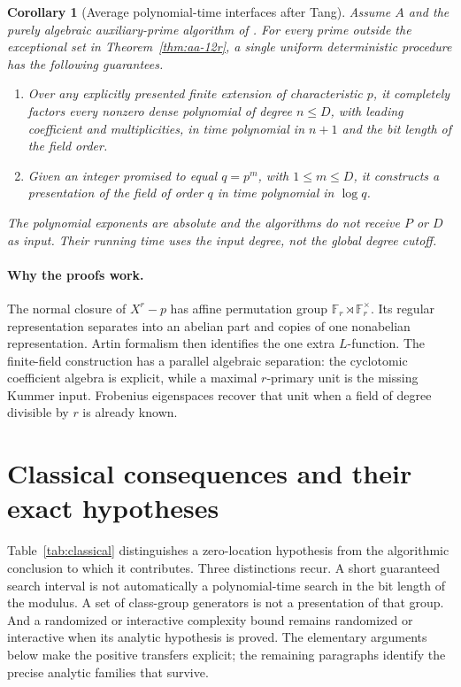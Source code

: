 \documentclass[11pt]{article}
\newcommand{\F}{\mathbb F}
\newtheorem{corollary}[theorem]{Corollary}
\theoremstyle{definition}
\theoremstyle{remark}
\begin{document}
\begin{corollary}[Average polynomial-time interfaces after Tang]\label{cor:aa-finite-field-algorithms}
Assume \(A\) and the purely algebraic auxiliary-prime algorithm
of \citet[Theorem~1.2, p.~3; Proposition~10.1, pp.~41--44]{OpenAI2026}.
For every prime outside the exceptional set in
Theorem~\ref{thm:aa-12r}, a single uniform deterministic procedure
has the following guarantees.
\begin{enumerate}
 \item Over any explicitly presented finite extension of characteristic
 \(p\), it completely factors every nonzero dense polynomial of degree
 \(n\leq D\), with leading coefficient and multiplicities, in time
 polynomial in \(n+1\) and the bit length of the field order.
 \item Given an integer promised to equal \(q=p^m\), with
 \(1\leq m\leq D\), it constructs a presentation of the field of order
 \(q\) in time polynomial in \(\log q\).
\end{enumerate}
The polynomial exponents are absolute and the algorithms do not
receive \(P\) or \(D\) as input. Their running time uses the input degree, not the global degree cutoff.
\end{corollary}

\paragraph{Why the proofs work.}
The normal closure of $X^r-p$ has affine permutation group
$\F_r\rtimes\F_r^\times$.  Its regular representation separates into
an abelian part and copies of one nonabelian representation.  Artin
formalism then identifies the one extra $L$-function.  The finite-field
construction has a parallel algebraic separation: the cyclotomic
coefficient algebra is explicit, while a maximal $r$-primary unit is
the missing Kummer input.  Frobenius eigenspaces recover that unit when
a field of degree divisible by $r$ is already known.

\section{Classical consequences and their exact hypotheses}
\label{sec:classical-consequences}

Table~\ref{tab:classical} distinguishes a zero-location hypothesis from the
algorithmic conclusion to which it contributes. Three distinctions recur.
A short guaranteed search interval is not automatically a polynomial-time
search in the bit length of the modulus. A set of class-group generators is
not a presentation of that group. And a randomized or interactive complexity
bound remains randomized or interactive when its analytic hypothesis is
proved. The elementary arguments below make the positive transfers explicit;
the remaining paragraphs identify the precise analytic families that survive.
\end{document}

